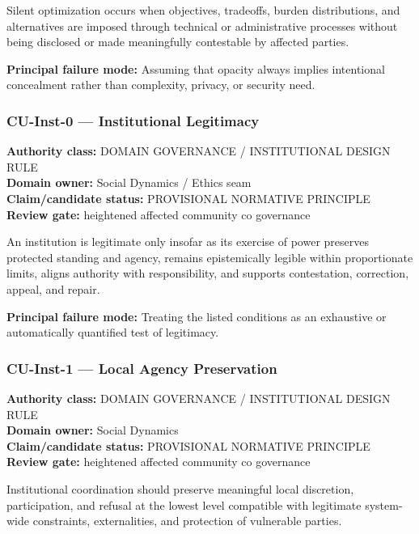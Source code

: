 \documentclass[
  11pt,
]{article}
\begin{document}
Silent optimization occurs when objectives, tradeoffs, burden
distributions, and alternatives are imposed through technical or
administrative processes without being disclosed or made meaningfully
contestable by affected parties.

\textbf{Principal failure mode:} Assuming that opacity always implies
intentional concealment rather than complexity, privacy, or security
need.

\subsubsection{CU-Inst-0 --- Institutional
Legitimacy}\label{cu-inst-0-institutional-legitimacy}

\textbf{Authority class:} DOMAIN GOVERNANCE / INSTITUTIONAL DESIGN
RULE\\
\textbf{Domain owner:} Social Dynamics / Ethics seam\\
\textbf{Claim/candidate status:} PROVISIONAL NORMATIVE PRINCIPLE\\
\textbf{Review gate:} heightened affected community co governance

An institution is legitimate only insofar as its exercise of power
preserves protected standing and agency, remains epistemically legible
within proportionate limits, aligns authority with responsibility, and
supports contestation, correction, appeal, and repair.

\textbf{Principal failure mode:} Treating the listed conditions as an
exhaustive or automatically quantified test of legitimacy.

\subsubsection{CU-Inst-1 --- Local Agency
Preservation}\label{cu-inst-1-local-agency-preservation}

\textbf{Authority class:} DOMAIN GOVERNANCE / INSTITUTIONAL DESIGN
RULE\\
\textbf{Domain owner:} Social Dynamics\\
\textbf{Claim/candidate status:} PROVISIONAL NORMATIVE PRINCIPLE\\
\textbf{Review gate:} heightened affected community co governance

Institutional coordination should preserve meaningful local discretion,
participation, and refusal at the lowest level compatible with
legitimate system-wide constraints, externalities, and protection of
vulnerable parties.
\end{document}
